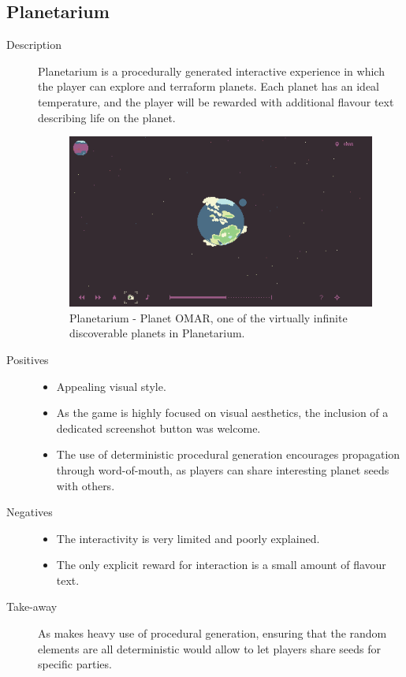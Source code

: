 \clearpage
\subsection{Planetarium}
\begin{description}
\item[Description]{Planetarium is a procedurally generated interactive experience in which the player can explore and terraform planets. Each planet has an ideal temperature, and the player will be rewarded with additional flavour text describing life on the planet.

\begin{figure}[htb]
	\centering\includegraphics[width=.25\linewidth]{images/game_planetarium}
	\caption{Planetarium - Planet OMAR, one of the virtually infinite discoverable planets in Planetarium.}
	\label{fig:planetarium}
\end{figure}}
\item[Positives]{
\begin{itemize}
\item{Appealing visual style.}
\item{As the game is highly focused on visual aesthetics, the inclusion of a dedicated screenshot button was welcome.}
\item{The use of deterministic procedural generation encourages propagation through word-of-mouth, as players can share interesting planet seeds with others.}
\end{itemize}
}
\item[Negatives]{
\begin{itemize}
\item{The interactivity is very limited and poorly explained.}
\item{The only explicit reward for interaction is a small amount of flavour text.}
\end{itemize}
}
\item[Take-away]{As \ourgame{} makes heavy use of procedural generation, ensuring that the random elements are all deterministic would allow \ourteam{} to let players share seeds for specific parties.}
\end{description}


\clearpage
